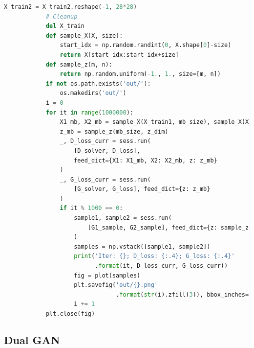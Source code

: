 \begin{lstlisting}[language = Python]
            X_train2 = X_train2.reshape(-1, 28*28)
            # Cleanup
            del X_train
            def sample_X(X, size):
                start_idx = np.random.randint(0, X.shape[0]-size)
                return X[start_idx:start_idx+size]
            def sample_z(m, n):
                return np.random.uniform(-1., 1., size=[m, n])
            if not os.path.exists('out/'):
                os.makedirs('out/')
            i = 0
            for it in range(1000000):
                X1_mb, X2_mb = sample_X(X_train1, mb_size), sample_X(X_train2, mb_size)
                z_mb = sample_z(mb_size, z_dim)
                _, D_loss_curr = sess.run(
                    [D_solver, D_loss],
                    feed_dict={X1: X1_mb, X2: X2_mb, z: z_mb}
                )
                _, G_loss_curr = sess.run(
                    [G_solver, G_loss], feed_dict={z: z_mb}
                )
                if it % 1000 == 0:
                    sample1, sample2 = sess.run(
                        [G1_sample, G2_sample], feed_dict={z: sample_z(8, z_dim)}
                    )
                    samples = np.vstack([sample1, sample2])
                    print('Iter: {}; D_loss: {:.4}; G_loss: {:.4}'
                          .format(it, D_loss_curr, G_loss_curr))
                    fig = plot(samples)
                    plt.savefig('out/{}.png'
                                .format(str(i).zfill(3)), bbox_inches='tight')
                    i += 1
            plt.close(fig)
            \end{lstlisting}

    \subsection{Dual GAN}
